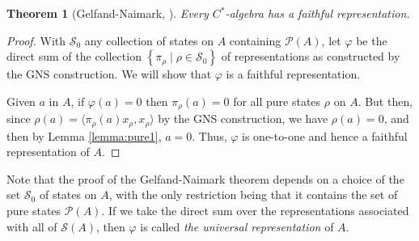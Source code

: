 \documentclass[11pt,a4paper]{report}
\theoremstyle{plain}
\newtheorem{thm}{Theorem}
\theoremstyle{definition}
\newcommand{\1}{\mathbbm{1}}
\renewcommand{\phi}{\varphi}
\renewcommand{\S}{\mathscr{S}}
\renewcommand{\P}[1]{\mathscr{P}(#1)}
\begin{document}
\begin{thm}[Gelfand-Naimark, {\cite[4.5.6]{kadison83}}] \label{thm:gn}
	Every $C^\ast$-algebra has a faithful representation.
\end{thm}
\begin{proof}
	With $\S_0$ any collection of states on $A$ containing $\P{A}$, let $\phi$ be 
	the direct sum of the collection $\left\{\pi_\rho \mid \rho\in\S_0\right\}$ of 
	representations as constructed by the GNS construction. We will show that $\phi$ 
	is a faithful representation.

	
	Given $a$ in $A$, if $\phi(a)=0$ then $\pi_\rho(a)=0$ for all pure states $\rho$ 
	on $A$. But then, since $\rho(a)=\langle \pi_\rho (a) x_\rho, x_\rho \rangle$ by 
	the GNS construction, we have $\rho(a)=0$, and then by Lemma \ref{lemma:pure1}, 
	$a=0$. Thus, $\phi$ is one-to-one and hence a faithful representation of $A$.

\end{proof}

Note that the proof of the Gelfand-Naimark theorem depends on a choice of the 
set $\S_0$ of states on $A$, with the only restriction being that it contains 
the set of pure states $\P A$. If we take the direct sum over the 
representations associated with all of $\S (A)$, then $\phi$ is called \emph{the 
universal representation} of $A$.
\end{document}
